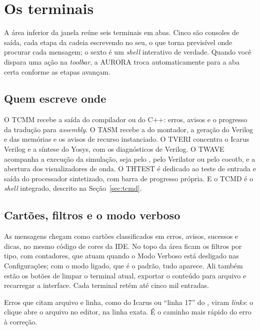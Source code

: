 \chapter{Os terminais}
\label{cap:terminais}

A área inferior da janela reúne seis terminais em abas. Cinco são consoles de saída, cada etapa da cadeia escrevendo no seu, o que torna previsível onde procurar cada mensagem; o sexto é um \textit{shell} interativo de verdade. Quando você dispara uma ação na \textit{toolbar}, a AURORA troca automaticamente para a aba certa conforme as etapas avançam.


\section{Quem escreve onde}

O TCMM recebe a saída do compilador \cmm{} ou do C++: erros, avisos e o progresso da tradução para \textit{assembly}. O TASM recebe a do montador, a geração do Verilog e das memórias e os avisos de recurso instanciado. O TVERI concentra o Icarus Verilog e a síntese do Yosys, com os diagnósticos de Verilog. O TWAVE acompanha a execução da simulação, seja pelo , pelo Verilator ou pelo cocotb, e a abertura dos visualizadores de onda. O THTEST é dedicado ao teste de entrada e saída do processador sintetizado, com barra de progresso própria. E o TCMD é o \textit{shell} integrado, descrito na Seção~\ref{sec:tcmd}.

\section{Cartões, filtros e o modo verboso}

As mensagens chegam como cartões classificados em erros, avisos, sucessos e dicas, no mesmo código de cores da IDE. No topo da área ficam os filtros por tipo, com contadores, que atuam quando o Modo Verboso está desligado nas Configurações; com o modo ligado, que é o padrão, tudo aparece. Ali também estão os botões de limpar o terminal atual, exportar o conteúdo para arquivo e recarregar a interface. Cada terminal retém até cinco mil entradas.

Erros que citam arquivo e linha, como  do Icarus ou \enquote{linha 17} do \cmm{}, viram \textit{links}: o clique abre o arquivo no editor, na linha exata. É o caminho mais rápido do erro à correção.

